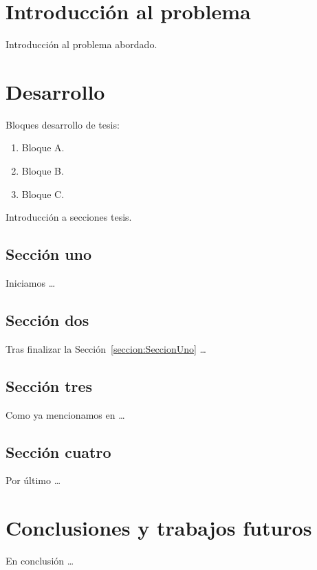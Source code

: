 

\section*{Introducción al problema}\label{seccion:IntroduccionProblema}

Introducción al problema abordado.

\section*{Desarrollo}\label{seccion:Desarrollo}

Bloques desarrollo de tesis: 

\begin{enumerate}[label=\Roman*]
	\item Bloque A.
	\item Bloque B. 
	\item Bloque C.
\end{enumerate}

Introducción a secciones tesis. 

\subsection*{Sección uno}\label{seccion:SeccionUno}

Iniciamos \dots 

\subsection*{Sección dos}\label{seccion:SeccionDos}

Tras finalizar la Sección~\ref{seccion:SeccionUno} \dots

\subsection*{Sección tres}\label{seccion:SeccionTres}

Como ya mencionamos en \dots 

\subsection*{Sección cuatro}\label{seccion:SeccionCuatro}

Por último \dots

\section*{Conclusiones y trabajos futuros}\label{seccion:ConclusionesResumen}

En conclusión \dots

